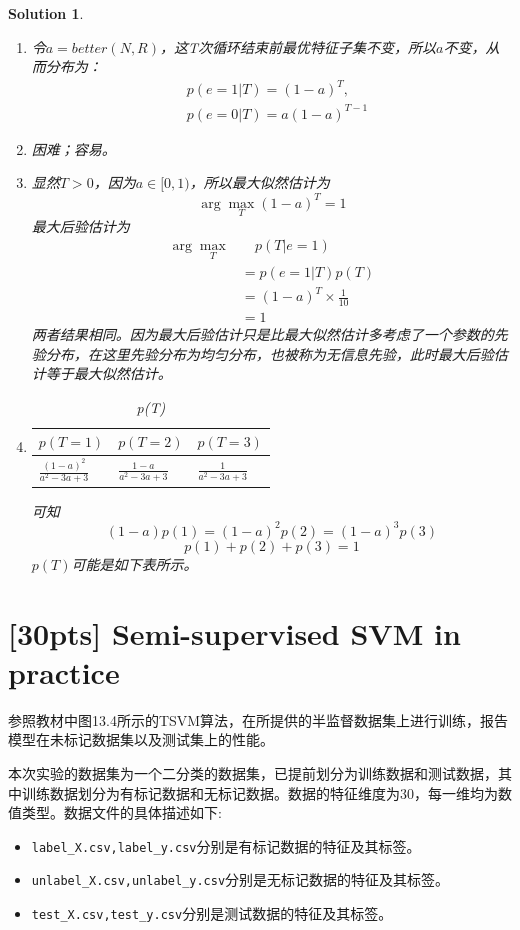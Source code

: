 \documentclass[a4paper,UTF8]{article}
\newtheorem*{solution}{Solution}
\numberwithin{equation}{section}
\begin{document}
\begin{solution}
\begin{enumerate}[$(1)$]
\begin{align*}
    \end{align*}
    当$N=0,1$时，$better(N,R)=0$，$N=2$时，$better(2,R)=0+\frac{2}{9}+0=\frac{2}{9}$。
    \item 令$a=better(N,R)$，这T次循环结束前最优特征子集不变，所以$a$不变，从而分布为：
           \begin{align*}
           &p(e=1|T)=(1-a)^{T},\\
           &p(e=0|T)=a(1-a)^{T-1}
           \end{align*}
    \item 困难；容易。
    \item 显然$T>0$，因为$a\in[0,1)$，所以最大似然估计为$$\arg\max_T (1-a)^T=1$$
          最大后验估计为
          \begin{align*}
          	\arg\max_T &\quad p(T|e=1)\\
          	           &=p(e=1|T)p(T)\\
          	                   &=(1-a)^T\times\frac{1}{10}\\
          	                   &=1
          \end{align*}
          两者结果相同。因为最大后验估计只是比最大似然估计多考虑了一个参数的先验分布，在这里先验分布为均匀分布，也被称为无信息先验，此时最大后验估计等于最大似然估计。
     \item \begin{table}
     	\centering
     	\caption{p(T)}
     	\begin{tabular}{|l|l|l|}
     		\hline
     		$p(T=1)$ & $p(T=2)$ & $p(T=3)$ \\ \hline
     		$\frac{(1-a)^2}{a^2-3a+3}$ & $\frac{1-a}{a^2-3a+3}$ & $\frac{1}{a^2-3a+3}$      \\
     		\hline
     	\end{tabular}
     \end{table}\label{table:pT} 
         可知$$(1-a)p(1)=(1-a)^2p(2)=(1-a)^3p(3)$$$$p(1)+p(2)+p(3)=1$$
         $p(T)$可能是如下表所示。
\end{enumerate}
\end{solution}

\section{\textbf{[30pts]} Semi-supervised SVM in practice}
参照教材中图13.4所示的TSVM算法，在所提供的半监督数据集上进行训练，报告模型在未标记数据集以及测试集上的性能。

本次实验的数据集为一个二分类的数据集，已提前划分为训练数据和测试数据，其中训练数据划分为有标记数据和无标记数据。数据的特征维度为30，每一维均为数值类型。数据文件的具体描述如下:
\begin{itemize}
    \item \texttt{label\_X.csv,label\_y.csv}分别是有标记数据的特征及其标签。
    \item \texttt{unlabel\_X.csv,unlabel\_y.csv}分别是无标记数据的特征及其标签。
    \item \texttt{test\_X.csv,test\_y.csv}分别是测试数据的特征及其标签。
\end{itemize}
\end{document}
